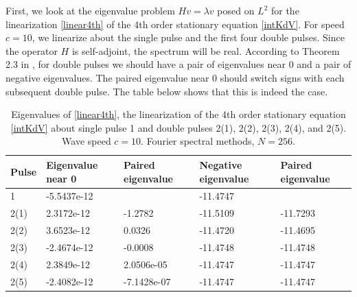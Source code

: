 \documentclass[12pt]{article}
\begin{document}
First, we look at the eigenvalue problem $Hv = \lambda v$ posed on $L^2$ for the linearization \eqref{linear4th} of the 4th order stationary equation \eqref{intKdV}. For speed $c = 10$, we linearize about the single pulse and the first four double pulses. Since the operator $H$ is self-adjoint, the spectrum will be real. According to Theorem 2.3 in \cite{Pelinovsky2007}, for double pulses we should have a pair of eigenvalues near 0 and a pair of negative eigenvalues. The paired eigenvalue near 0 should switch signs with each subsequent double pulse. The table below shows that this is indeed the case.

\begin{table}[H]
\begin{tabular}{l|ll|ll}
Pulse  & Eigenvalue near 0  & Paired eigenvalue & Negative eigenvalue & Paired eigenvalue \\ \hline
1      & -5.5437e-12        &                   & -11.4747            &                   \\
2(1)   & 2.3172e-12         & -1.2782			& -11.5109            & -11.7293          \\
2(2)   & 3.6523e-12         & 0.0326            & -11.4720            & -11.4695          \\
2(3)   & -2.4674e-12        & -0.0008           & -11.4748            & -11.4748          \\
2(4)   & 2.3849e-12         & 2.0506e-05        & -11.4747            & -11.4747          \\
2(5)   & -2.4082e-12        & -7.1428e-07       & -11.4747            & -11.4747          \\
\end{tabular}
\caption{Eigenvalues of \eqref{linear4th}, the linearization of the 4th order stationary equation \eqref{intKdV} about single pulse 1 and double pulses 2(1), 2(2), 2(3), 2(4), and 2(5). Wave speed $c = 10$. Fourier spectral methods, $N = 256$.}
\end{table}
\end{document}
